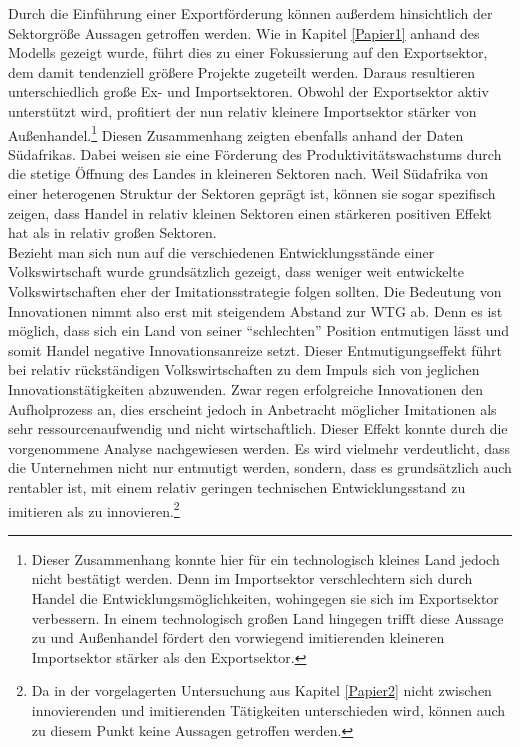 \newline

Durch die Einf{\"u}hrung einer Exportf{\"o}rderung k{\"o}nnen au{\ss}erdem hinsichtlich der Sektorgr{\"o}{\ss}e Aussagen getroffen werden. Wie in Kapitel \ref{Papier1} anhand des Modells gezeigt wurde, f{\"u}hrt dies zu einer Fokussierung auf den Exportsektor, dem damit tendenziell gr{\"o}{\ss}ere Projekte zugeteilt werden. Daraus resultieren unterschiedlich gro{\ss}e Ex- und Importsektoren. Obwohl der Exportsektor aktiv unterst{\"u}tzt wird, profitiert der nun relativ kleinere Importsektor st{\"a}rker von Au{\ss}enhandel.\footnote{Dieser Zusammenhang konnte hier f{\"u}r ein technologisch kleines Land jedoch nicht best{\"a}tigt werden. Denn im Importsektor verschlechtern sich durch Handel die Entwicklungsm{\"o}glichkeiten, wohingegen sie sich im Exportsektor verbessern. In einem technologisch gro{\ss}en Land hingegen trifft diese Aussage zu und Au{\ss}enhandel f{\"o}rdert den vorwiegend imitierenden kleineren Importsektor st{\"a}rker als den Exportsektor.} Diesen Zusammenhang zeigten ebenfalls \citet{Aghion.2013} anhand der Daten S{\"u}dafrikas. 
Dabei weisen sie eine F{\"o}rderung des Produktivit{\"a}tswachstums durch die stetige {\"O}ffnung des Landes in kleineren Sektoren nach.  Weil S{\"u}dafrika von einer heterogenen Struktur der Sektoren gepr{\"a}gt ist, k{\"o}nnen sie sogar spezifisch zeigen, dass Handel in relativ kleinen Sektoren einen st{\"a}rkeren positiven Effekt hat als in relativ gro{\ss}en Sektoren.\\
Bezieht man sich nun auf die verschiedenen Entwicklungsst{\"a}nde einer Volkswirtschaft 
wurde grunds{\"a}tzlich gezeigt, dass weniger weit entwickelte Volkswirtschaften eher der Imitationsstrategie folgen sollten. Die Bedeutung von Innovationen nimmt also erst mit steigendem Abstand zur WTG ab. Denn es ist m{\"o}glich, dass sich ein Land von seiner "`schlechten"' Position entmutigen l{\"a}sst und somit Handel negative Innovationsanreize setzt. Dieser Entmutigungseffekt f{\"u}hrt bei relativ r{\"u}ckst{\"a}ndigen Volkswirtschaften zu dem Impuls sich von jeglichen Innovationst{\"a}tigkeiten abzuwenden. Zwar regen erfolgreiche Innovationen den Aufholprozess an, dies erscheint jedoch in Anbetracht m{\"o}glicher Imitationen als sehr ressourcenaufwendig und nicht wirtschaftlich.  
Dieser Effekt konnte durch die vorgenommene Analyse nachgewiesen werden. Es wird vielmehr verdeutlicht, dass die Unternehmen nicht nur entmutigt werden, sondern, dass es grunds{\"a}tzlich auch rentabler ist, mit einem relativ geringen technischen Entwicklungsstand zu imitieren als zu innovieren.\footnote{Da in der vorgelagerten Untersuchung aus Kapitel \ref{Papier2} nicht zwischen innovierenden und imitierenden T{\"a}tigkeiten unterschieden wird, k{\"o}nnen auch zu diesem Punkt keine Aussagen getroffen werden.} \\

